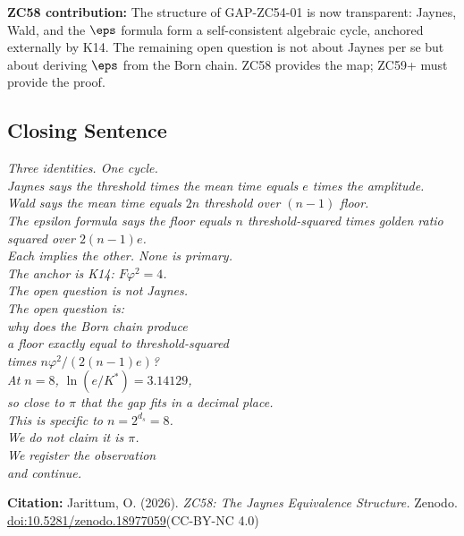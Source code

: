 \documentclass[12pt, a4paper]{article}
\begin{document}
\begin{genealogybox}
\medskip
\textbf{ZC58 contribution:}
The structure of GAP-ZC54-01 is now transparent: Jaynes, Wald,
and the $\eps$ formula form a self-consistent algebraic cycle,
anchored externally by K14.  The remaining open question is not
about Jaynes per se but about deriving $\eps$ from the Born chain.
ZC58 provides the map; ZC59+ must provide the proof.
\end{genealogybox}

\subsection{Closing Sentence}

\begin{center}
\textit{%
  Three identities. One cycle.\\[0.5em]
  Jaynes says the threshold times the mean time equals $e$ times the amplitude.\\
  Wald says the mean time equals $2n$ threshold over $(n{-}1)$ floor.\\
  The epsilon formula says the floor equals $n$ threshold-squared
  times golden ratio squared over $2(n{-}1)e$.\\[0.3em]
  Each implies the other. None is primary.\\
  The anchor is K14: $F\varphi^2 = 4$.\\[0.5em]
  The open question is not Jaynes.\\
  The open question is:\\
  why does the Born chain produce\\
  a floor exactly equal to threshold-squared\\
  times $n\varphi^2/(2(n{-}1)e)$?\\[0.5em]
  At $n=8$, $\ln(e/K^*)=3.14129$,\\
  so close to $\pi$ that the gap fits in a decimal place.\\
  This is specific to $n=2^{d_s}=8$.\\
  We do not claim it is $\pi$.\\
  We register the observation\\
  and continue.}
\end{center}

\bigskip
\begin{center}
\textbf{Citation:} Jarittum, O. (2026).
\textit{ZC58: The Jaynes Equivalence Structure.}
Zenodo.
\href{https://doi.org/10.5281/zenodo.18977059}%
{doi:10.5281/zenodo.18977059}\quad (CC-BY-NC 4.0)
\end{center}
\end{document}
